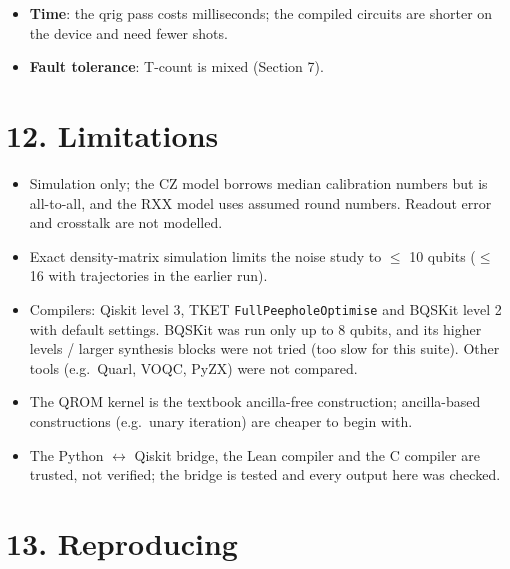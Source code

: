 \documentclass[
  10pt,
]{article}
\providecommand{\tightlist}{%
  \setlength{\itemsep}{0pt}\setlength{\parskip}{0pt}}
\begin{document}
\begin{itemize}
  BQSKit: qrig + BQSKit has fewer 2q gates on 24, equal on 69, more on 0
  of 93 circuits, total 10697 \ensuremath{\rightarrow} 7423 (-30.6 \%). The benefit is
  therefore not specific to Qiskit. TKET alone already reaches qrig's
  saving on the MQT Grover and multiplier circuits; on data loading
  (QROM, LCU SELECT, multiplexers), membership oracles and the control
  patterns, qrig lowers the count in front of all three compilers
  (Section 9).
\item
  \textbf{Time}: the qrig pass costs milliseconds; the compiled circuits
  are shorter on the device and need fewer shots.
\item
  \textbf{Fault tolerance}: T-count is mixed (Section 7).
\end{itemize}

\section{12. Limitations}\label{limitations}

\begin{itemize}
\tightlist
\item
  Simulation only; the CZ model borrows median calibration numbers but
  is all-to-all, and the RXX model uses assumed round numbers. Readout
  error and crosstalk are not modelled.
\item
  Exact density-matrix simulation limits the noise study to \ensuremath{\leq} 10 qubits
  (\ensuremath{\leq} 16 with trajectories in the earlier run).
\item
  Compilers: Qiskit level 3, TKET \texttt{FullPeepholeOptimise} and
  BQSKit level 2 with default settings. BQSKit was run only up to 8
  qubits, and its higher levels / larger synthesis blocks were not tried
  (too slow for this suite). Other tools (e.g.~Quarl, VOQC, PyZX) were
  not compared.
\item
  The QROM kernel is the textbook ancilla-free construction;
  ancilla-based constructions (e.g.~unary iteration) are cheaper to
  begin with.
\item
  The Python \ensuremath{\leftrightarrow} Qiskit bridge, the Lean compiler and the C compiler are
  trusted, not verified; the bridge is tested and every output here was
  checked.
\end{itemize}

\section{13. Reproducing}\label{reproducing}
\end{document}

